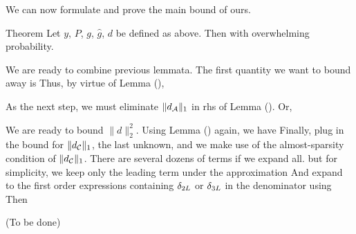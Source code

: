 We can now formulate and prove the main bound of ours.

\Result
{Theorem}
{
Let \(y\), \(P\), \(g\), \(\hat{g}\), \(d\) be defined as above.
Then
with overwhelming probability.
}

We are ready to combine previous lemmata.
The first quantity we want to bound away is
Thus, by virtue of Lemma (),

As the next step, we must eliminate \(\|d_{\mathcal{A}}\|_1\) in rhs of Lemma ().
Or,

We are ready to bound \(\| d \|_2^2\).
Using Lemma () again, we have
Finally, plug in the bound for \(\|d_{\mathcal{C}}\|_1\), the last unknown, and we make use of the almost-sparsity condition of \(\|d_{\mathcal{C}}\|_1\).
There are several dozens of terms if we expand all.
but for simplicity, we keep only the leading term under the approximation
And expand to the first order expressions containing \(\delta_{2L}\) or \(\delta_{3L}\) in the denominator using
Then



{ \color{red} (To be done) }
